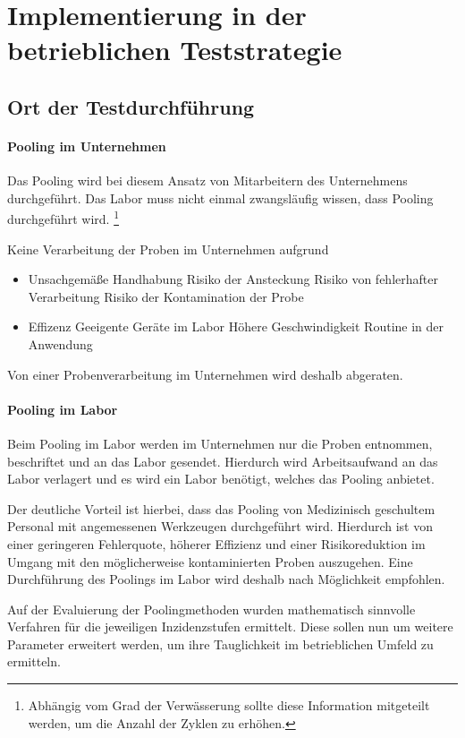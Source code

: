 \chapter{Implementierung in der betrieblichen Teststrategie}
\section{Ort der Testdurchführung}

\subsubsection{Pooling im Unternehmen}
Das Pooling wird bei diesem Ansatz von Mitarbeitern des Unternehmens durchgeführt.
Das Labor muss nicht einmal zwangsläufig wissen, dass Pooling durchgeführt wird.
\footnote{Abhängig vom Grad der Verwässerung sollte diese Information mitgeteilt werden, um die Anzahl der Zyklen zu erhöhen.}

Keine Verarbeitung der Proben im Unternehmen aufgrund 
\begin{itemize}
	\item Unsachgemäße Handhabung
	\subitem Risiko der Ansteckung
	\subitem Risiko von fehlerhafter Verarbeitung
	\subitem Risiko der Kontamination der Probe
	\item Effizenz
	\subitem Geeigente Geräte im Labor
	\subitem Höhere Geschwindigkeit
	\subitem Routine in der Anwendung
\end{itemize}

Von einer Probenverarbeitung im Unternehmen wird deshalb abgeraten.

\subsubsection{Pooling im Labor}
Beim Pooling im Labor werden im Unternehmen nur die Proben entnommen, beschriftet und an das Labor gesendet.
Hierdurch wird Arbeitsaufwand an das Labor verlagert und es wird ein Labor benötigt, welches das Pooling anbietet.

Der deutliche Vorteil ist hierbei, dass das Pooling von Medizinisch geschultem Personal mit angemessenen Werkzeugen durchgeführt wird.
Hierdurch ist von einer geringeren Fehlerquote, höherer Effizienz und einer Risikoreduktion im Umgang mit den möglicherweise kontaminierten Proben auszugehen.
Eine Durchführung des Poolings im Labor wird deshalb nach Möglichkeit empfohlen.

Auf der Evaluierung der Poolingmethoden wurden mathematisch sinnvolle Verfahren für die jeweiligen Inzidenzstufen ermittelt.
Diese sollen nun um weitere Parameter erweitert werden, um ihre Tauglichkeit im betrieblichen Umfeld zu ermitteln.


